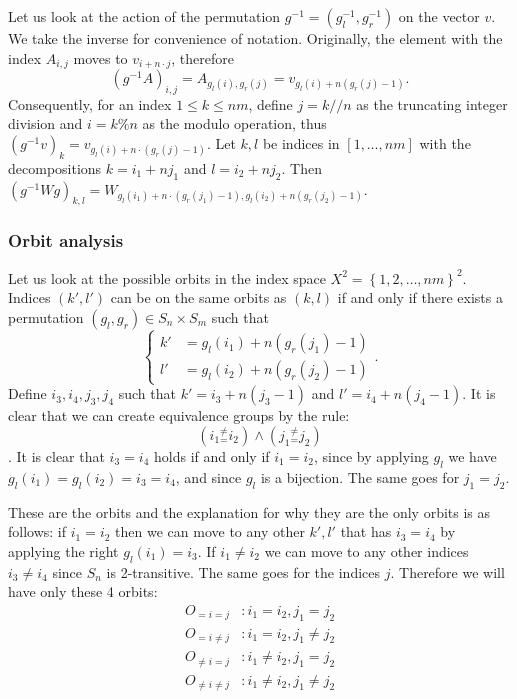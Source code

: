 \documentclass[english]{article}
\begin{document}
Let us look at the action of the permutation $g^{-1}=(g_{l}^{-1},g_{r}^{-1})$
on the vector $v$. We take the inverse for convenience of notation.
Originally, the element with the index $A_{i,j}$ moves to $v_{i+n\cdot j}$,
therefore 
\[
\left(g^{-1}A\right)_{i,j}=A_{g_{l}(i),g_{r}(j)}=v_{g_{l}(i)+n\left(g_{r}(j)-1\right)}.
\]
Consequently, for an index $1\leq k\leq nm$, define $j=k//n$ as the
truncating integer division and $i=k\%n$ as the modulo operation, thus $\left(g^{-1}v\right)_{k}=v_{g_{l}(i)+n\cdot\left(g_{r}(j)-1\right)}$.
Let $k,l$ be indices in $\left[1,\ldots,nm\right]$ with the decompositions
$k=i_{1}+nj_{1}$ and $l=i_{2}+nj_{2}$. Then $\left(g^{-1}Wg\right)_{k,l}=W_{g_{l}(i_{1})+n\cdot\left(g_{r}(j_{1})-1\right),g_{l}(i_{2})+n\left(g_{r}(j_{2})-1\right)}$. 

\subsubsection{Orbit analysis}

Let us look at the possible orbits in the index space $X^{2}=\left\{ 1,2,\ldots,nm\right\} ^{2}$.
Indices $\left(k',l'\right)$ can be on the same orbits as $\left(k,l\right)$
if and only if there exists a permutation $\left(g_{l},g_{r}\right)\in S_{n}\times S_{m}$
such that 
\[
\begin{cases}
k' & =g_{l}(i_{1})+n\left(g_{r}(j_{1})-1\right)\\
l' & =g_{l}(i_{2})+n\left(g_{r}(j_{2})-1\right)
\end{cases}.
\]
Define $i_{3},i_{4},j_{3},j_{4}$ such that $k'=i_{3}+n(j_{3}-1)$
and $l'=i_{4}+n(j_{4}-1)$. It is clear that we can create equivalence
groups by the rule: 
\[
\left(i_{1}{}_{=}^{\neq}i_{2}\right)\wedge\left(j_{1}{}_{=}^{\neq}j_{2}\right)
\]
. It is clear that $i_{3}=i_{4}$ holds if and only if $i_{1}=i_{2}$,
since by applying $g_{l}$ we have $g_{l}(i_{1})=g_{l}(i_{2})=i_{3}=i_{4}$,
and since $g_{l}$ is a bijection. The same goes for $j_{1}=j_{2}$. 

These are the orbits and the explanation for why they are the only orbits
is as follows: if $i_{1}=i_{2}$ then we can move to any other $k',l'$
that has $i_{3}=i_{4}$ by applying the right $g_{l}(i_{1})=i_{3}$.
If $i_{1}\neq i_{2}$ we can move to any other indices $i_{3}\neq i_{4}$
since $S_{n}$ is 2-transitive. The same goes for the indices $j$. Therefore
we will have only these 4 orbits:
\begin{align*}
O_{=i=j} & :i_{1}=i_{2},j_{1}=j_{2}\\
O_{=i\neq j} & :i_{1}=i_{2},j_{1}\neq j_{2}\\
O_{\neq i=j} & :i_{1}\neq i_{2},j_{1}=j_{2}\\
O_{\neq i\neq j} & :i_{1}\neq i_{2},j_{1}\neq j_{2}
\end{align*}
\end{document}
